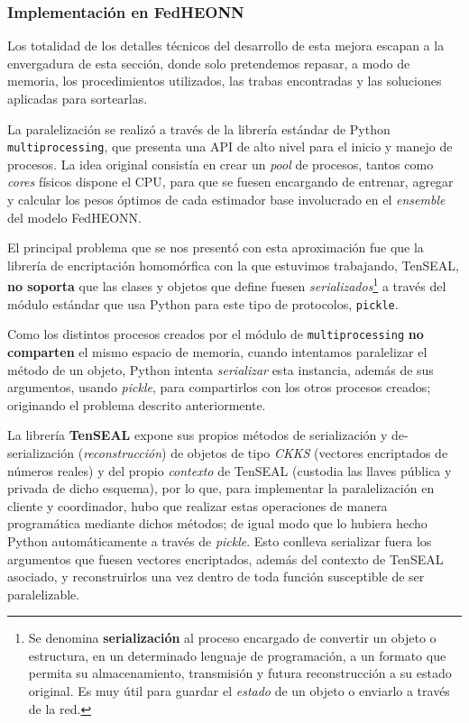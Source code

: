 \documentclass[00-Trabajo_Final.tex]{subfiles}
\begin{document}
\subsubsection*{Implementación en FedHEONN}
Los totalidad de los detalles técnicos del desarrollo de esta mejora escapan a la envergadura de esta sección, donde solo pretendemos repasar, a modo de memoria, los procedimientos utilizados, las trabas encontradas y las soluciones aplicadas para sortearlas.

\vspace{0.5em}

La paralelización se realizó a través de la librería estándar de Python \verb|multiprocessing|, que presenta una API de alto nivel para el inicio y manejo de procesos. La idea original consistía en crear un \textit{pool} de procesos, tantos como \textit{cores} físicos dispone el CPU, para que se fuesen encargando de entrenar, agregar y calcular los pesos óptimos de cada estimador base involucrado en el \textit{ensemble} del modelo FedHEONN.

\vspace{0.5em}

El principal problema que se nos presentó con esta aproximación fue que la librería de encriptación homomórfica con la que estuvimos trabajando, TenSEAL, \textbf{no soporta} que las clases y objetos que define fuesen \textit{serializados}\footnote{Se denomina \textbf{serialización} al proceso encargado de convertir un objeto o estructura, en un determinado lenguaje de programación, a un formato que permita su almacenamiento, transmisión y futura reconstrucción a su estado original. Es muy útil para guardar el \textit{estado} de un objeto o enviarlo a través de la red.} a través del módulo estándar que usa Python para este tipo de protocolos, \verb|pickle|.

\vspace{0.5em}

Como los distintos procesos creados por el módulo de \verb|multiprocessing| \textbf{no comparten} el mismo espacio de memoria, cuando intentamos paralelizar el método de un objeto, Python intenta \textit{serializar} esta instancia, además de sus argumentos, usando \textit{pickle}, para compartirlos con los otros procesos creados; originando el problema descrito anteriormente.

\vspace{0.5em}

La librería \textbf{TenSEAL} expone sus propios métodos de serialización y de-serialización (\textit{reconstrucción}) de objetos de tipo \textit{CKKS} (vectores encriptados de números reales) y del propio \textit{contexto} de TenSEAL (custodia las llaves pública y privada de dicho esquema), por lo que, para implementar la paralelización en cliente y coordinador, hubo que realizar estas operaciones de manera programática mediante dichos métodos; de igual modo que lo hubiera hecho Python automáticamente a través de \textit{pickle}. Esto conlleva serializar fuera los argumentos que fuesen vectores encriptados, además del contexto de TenSEAL asociado, y reconstruirlos una vez dentro de toda función susceptible de ser paralelizable.
\end{document}
